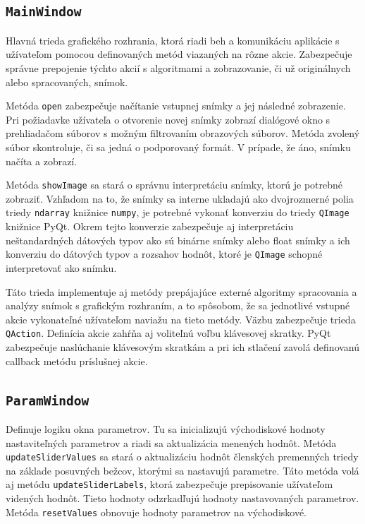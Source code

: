   \subsection{\texttt{MainWindow}}
  Hlavná trieda grafického rozhrania, ktorá riadi beh a komunikáciu aplikácie s užívateľom pomocou definovaných metód viazaných na rôzne akcie.
  Zabezpečuje správne prepojenie týchto akcií s algoritmami a zobrazovanie, či už originálnych alebo spracovaných, snímok.

  Metóda \texttt{open} zabezpečuje načítanie vstupnej snímky a jej následné zobrazenie. Pri požiadavke užívateľa o otvorenie novej snímky zobrazí
  dialógové okno s prehliadačom súborov s možným filtrovaním obrazových súborov. Metóda zvolený súbor skontroluje, či sa jedná o podporovaný formát.
  V prípade, že áno, snímku načíta a zobrazí.

  Metóda \texttt{showImage} sa stará o správnu interpretáciu snímky, ktorú je potrebné zobraziť. Vzhľadom na to, že snímky sa interne ukladajú ako
  dvojrozmerné polia triedy \texttt{ndarray} knižnice \texttt{numpy}, je potrebné vykonať konverziu do triedy \texttt{QImage} knižnice PyQt. Okrem tejto
  konverzie zabezpečuje aj interpretáciu neštandardných dátových typov ako sú binárne snímky alebo float snímky a ich konverziu do dátových typov a rozsahov
  hodnôt, ktoré je \texttt{QImage} schopné interpretovať ako snímku.

  Táto trieda implementuje aj metódy prepájajúce externé algoritmy spracovania a analýzy snímok s grafickým rozhraním, a to spôsobom, že sa jednotlivé
  vstupné akcie vykonateľné užívateľom naviažu na tieto metódy. Väzbu zabezpečuje trieda \texttt{QAction}. Definícia akcie zahŕňa aj voliteľnú  voľbu
  klávesovej skratky. PyQt zabezpečuje naslúchanie klávesovým skratkám a pri ich stlačení zavolá definovanú callback metódu príslušnej akcie.

  \subsection{\texttt{ParamWindow}}
  Definuje logiku okna parametrov. Tu sa inicializujú východiskové hodnoty nastaviteľných parametrov a riadi sa aktualizácia menených hodnôt.
  Metóda \texttt{updateSliderValues} sa stará o aktualizáciu hodnôt členských premenných triedy na základe posuvných bežcov, ktorými sa nastavujú parametre.
  Táto metóda volá aj metódu \texttt{updateSliderLabels}, ktorá zabezpečuje prepisovanie užívateľom videných hodnôt. Tieto hodnoty odzrkadľujú hodnoty
  nastavovaných parametrov. Metóda \texttt{resetValues} obnovuje hodnoty parametrov na východiskové.

